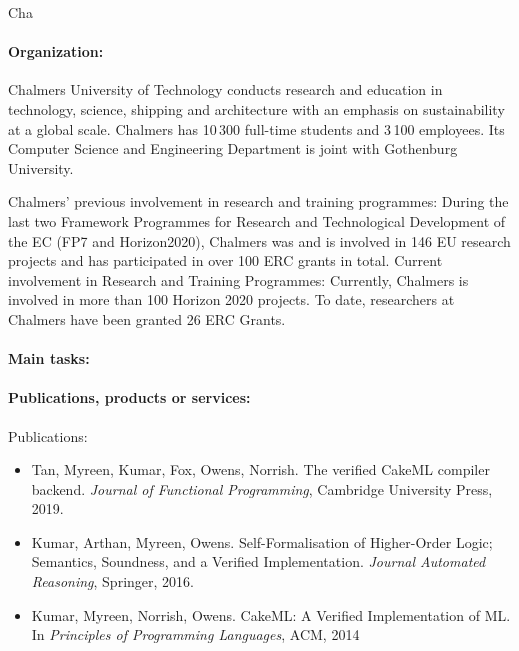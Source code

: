 \begin{sitedescription}{Cha}

\paragraph*{Organization:}

Chalmers University of Technology conducts research and education in
technology, science, shipping and architecture with an emphasis on
sustainability at a global scale. Chalmers has 10\,300 full-time
students and 3\,100 employees.  Its Computer Science and Engineering
Department is joint with Gothenburg University.

Chalmers' previous involvement in research and training programmes:
During the last two Framework Programmes for Research and
Technological Development of the EC (FP7 and Horizon2020), Chalmers
was and is involved in 146 EU research projects and has participated
in over 100 ERC grants in total.  Current involvement in Research and
Training Programmes: Currently, Chalmers is involved in more than 100
Horizon 2020 projects.  To date, researchers at Chalmers have been
granted 26 ERC Grants.


\paragraph*{Main tasks:}

\begin{compactitem}
\item{}
\end{compactitem}

\paragraph*{Publications, products or services:}

Publications:
\begin{itemize}
\item
  Tan, Myreen, Kumar, Fox, Owens, Norrish.
  The verified CakeML compiler backend.
  \emph{Journal of Functional Programming}, Cambridge University Press, 2019.
\item
  Kumar, Arthan, Myreen, Owens.
  Self-Formalisation of Higher-Order Logic;
  Semantics, Soundness, and a Verified Implementation.
  \emph{Journal Automated Reasoning}, Springer, 2016.
\item
  Kumar, Myreen, Norrish, Owens.
  CakeML: A Verified Implementation of ML.
  In \emph{Principles of Programming Languages}, ACM, 2014
\end{itemize}


\end{sitedescription}
